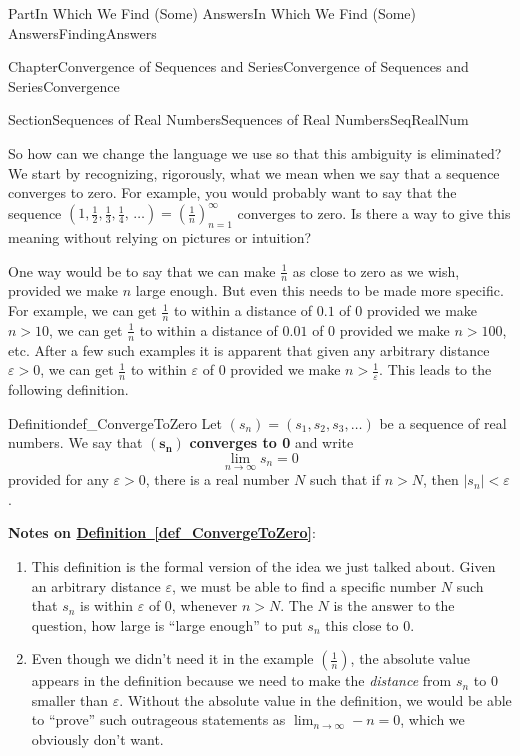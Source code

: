 \documentclass[oneside,10pt,]{book}
\newcommand{\xreffont}{\relax}
\newcommand{\terminology}[1]{\textbf{#1}}
\numberwithin{equation}{part}
\def\limit#1#2#3{{\displaystyle\lim_{#1\rightarrow #2}#3}}
\def\limitt#1#2#3{{\displaystyle\lim_{#1\rightarrow #2}\textstyle #3}}
\newcommand{\eps}{\varepsilon}
\newcommand{\lt}{<}
\begin{document}
\begin{partptx}{Part}{In Which We Find (Some) Answers}{}{In Which We Find (Some) Answers}{}{}{FindingAnswers}
\begin{chapterptx}{Chapter}{Convergence of Sequences and Series}{}{Convergence of Sequences and Series}{}{}{Convergence}
\begin{sectionptx}{Section}{Sequences of Real Numbers}{}{Sequences of Real Numbers}{}{}{SeqRealNum}
\par
So how can we change the language we use so that this ambiguity is eliminated?  We start by recognizing, rigorously, what we mean when we say that a sequence converges to zero.  For example, you would probably want to say that the sequence \(\left(1,\frac{1}{2},\frac{1}{3},\frac{1}{4},\,\ldots\right)=\left(
\frac{1}{n}\right)_{n=1}^\infty\) converges to zero.  Is there a way to give this meaning without relying on pictures or intuition?%
\par
One way would be to say that we can make \(\frac{1}{n}\) as close to zero as we wish, provided we make \(n\) large enough. But even this needs to be made more specific. For example, we can get \(\frac{1}{n}\) to within a distance of \(0.1\) of \(0\) provided we make \(n>10\), we can get \(\frac{1}{n}\) to within a distance of \(0.01\) of \(0\) provided we make \(n>100\), etc. After a few such examples it is apparent that given any arbitrary distance \(\eps>0\), we can get \(\frac{1}{n}\) to within \(\eps\) of \(0\) provided we make \(n>\frac{1}{\eps}\). This leads to the following definition.%
\begin{definition}{Definition}{}{def_ConvergeToZero}%
 Let \(\left(s_n\right)=\left(s_1,s_2,s_3,\ldots\right)\) be a sequence of real numbers. We say that \(\left(\boldsymbol{s}_{\boldsymbol{n}}\right)\) \terminology{converges to 0} and write%
\begin{equation*}
\limit{n}{\infty}{s_n}=0
\end{equation*}
provided for any \(\eps>0\), there is a real number \(N\) such that if \(n>N\), then \(|s_n|\lt \eps\).%
\end{definition}
\terminology{Notes on \hyperref[def_ConvergeToZero]{Definition~{\xreffont\ref{def_ConvergeToZero}}}}:%
\begin{enumerate}
\item{}This definition is the formal version of the idea we just talked about. Given an arbitrary distance \(\eps\), we must be able to find a specific number \(N\) such that \(s_n\) is within \(\eps\) of \(0\), whenever \(n>N\).  The \(N\) is the answer to the question, how large is ``large enough'' to put \(s_n\) this close to \(0\).%
\item{}Even though we didn't need it in the example \(\left(\frac{1}{n}\right)\), the absolute value appears in the definition because we need to make the \emph{distance} from \(s_n\) to 0 smaller than \(\eps\). Without the absolute value in the definition, we would be able to ``prove'' such outrageous statements as \(\limitt{n}{\infty}{-n}=0\), which we obviously don't want.%

\end{enumerate}
\end{sectionptx}
\end{chapterptx}
\end{partptx}
\end{document}
